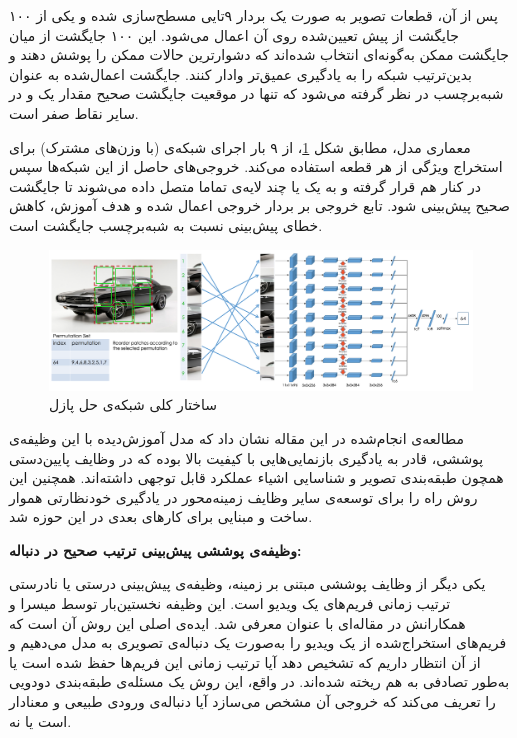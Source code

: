 پس از آن، قطعات تصویر به صورت یک بردار ۹تایی مسطح‌سازی شده و یکی از ۱۰۰ جایگشت از پیش تعیین‌شده روی آن اعمال می‌شود. این ۱۰۰ جایگشت از میان  جایگشت ممکن به‌گونه‌ای انتخاب شده‌اند که دشوارترین حالات ممکن را پوشش دهند و بدین‌ترتیب شبکه را به یادگیری عمیق‌تر وادار کنند. جایگشت اعمال‌شده به عنوان شبه‌برچسب در نظر گرفته می‌شود که تنها در موقعیت جایگشت صحیح مقدار یک و در سایر نقاط صفر است.

معماری مدل، مطابق شکل \ref{fig:jigsaw}، از ۹ بار اجرای شبکه‌ی  (با وزن‌های مشترک) برای استخراج ویژگی از هر قطعه استفاده می‌کند. خروجی‌های حاصل از این شبکه‌ها سپس در کنار هم قرار گرفته و به یک یا چند لایه‌ی تماما متصل داده می‌شوند تا جایگشت صحیح پیش‌بینی شود. تابع خروجی  بر بردار خروجی اعمال شده و هدف آموزش، کاهش خطای پیش‌بینی نسبت به شبه‌برچسب جایگشت است.

\begin{figure}[htbp]
\centering
\includegraphics[width=1\textwidth]{Images/Chapter2/jigsaw.png}
\caption{ساختار کلی شبکه‌ی حل پازل}
\label{fig:jigsaw}
\end{figure}

مطالعه‌ی انجام‌شده در این مقاله نشان داد که مدل آموزش‌دیده با این وظیفه‌ی پوششی، قادر به یادگیری بازنمایی‌هایی با کیفیت بالا بوده که در وظایف پایین‌دستی همچون طبقه‌بندی تصویر و شناسایی اشیاء عملکرد قابل توجهی داشته‌اند. همچنین این روش راه را برای توسعه‌ی سایر وظایف زمینه‌محور در یادگیری خودنظارتی هموار ساخت و مبنایی برای کارهای بعدی\cite{li2021jigsawgan,park2024fine} در این حوزه شد. \newline

\noindent\textbf{وظیفه‌ی پوششی پیش‌بینی ترتیب صحیح در دنباله:}

یکی دیگر از وظایف پوششی مبتنی بر زمینه، وظیفه‌ی پیش‌بینی درستی یا نادرستی ترتیب زمانی فریم‌های یک ویدیو است. این وظیفه نخستین‌بار توسط میسرا و همکارانش در مقاله‌ای با عنوان  \cite{misra2016shuffle} معرفی شد. ایده‌ی اصلی این روش آن است که فریم‌های استخراج‌شده از یک ویدیو را به‌صورت یک دنباله‌ی تصویری به مدل می‌دهیم و از آن انتظار داریم که تشخیص دهد آیا ترتیب زمانی این فریم‌ها حفظ شده است یا به‌طور تصادفی به هم ریخته شده‌اند. در واقع، این روش یک مسئله‌ی طبقه‌بندی دودویی را تعریف می‌کند که خروجی آن مشخص می‌سازد آیا دنباله‌ی ورودی طبیعی و معنادار است یا نه.

